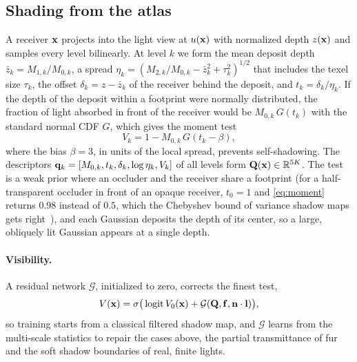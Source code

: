 \subsection{Shading from the atlas}
\label{sec:shading}
A receiver $\mathbf{x}$ projects into the light view at $u(\mathbf{x})$ with normalized depth $z(\mathbf{x})$ and samples every level bilinearly.
At level $k$ we form the mean deposit depth $\bar z_k=M_{1,k}/M_{0,k}$, a spread $\eta_k=(M_{2,k}/M_{0,k}-\bar z_k^2+\tau_k^2)^{1/2}$ that includes the texel size $\tau_k$, the offset $\delta_k=z-\bar z_k$ of the receiver behind the deposit, and $t_k=\delta_k/\eta_k$.
If the depth of the deposit within a footprint were normally distributed, the fraction of light absorbed in front of the receiver would be $M_{0,k}\,G(t_k)$ with the standard normal CDF $G$, which gives the moment test
\begin{equation}
  V_k=1-M_{0,k}\,G(t_k-\beta),
  \label{eq:moment}
\end{equation}
where the bias $\beta=3$, in units of the local spread, prevents self-shadowing.
The descriptors $\mathbf{q}_k=[M_{0,k},t_k,\delta_k,\log\eta_k,V_k]$ of all levels form $\mathbf{Q}(\mathbf{x})\in\mathbb R^{5K}$.
The test is a weak prior where an occluder and the receiver share a footprint (for a half-transparent occluder in front of an opaque receiver, $t_0=1$ and \cref{eq:moment} returns $0.98$ instead of $0.5$, which the Chebyshev bound of variance shadow maps gets right~\cite{donnelly2006variance}), and each Gaussian deposits the depth of its center, so a large, obliquely lit Gaussian appears at a single depth.

\paragraph{Visibility.}
A residual network $\mathcal G$, initialized to zero, corrects the finest test,
\begin{equation}
  V(\mathbf{x})=\sigma\big(\operatorname{logit} V_0(\mathbf{x})+\mathcal G(\mathbf{Q},\mathbf{f},\mathbf{n}\cdot\mathbf{l})\big),
  \label{eq:visibility}
\end{equation}
so training starts from a classical filtered shadow map, and $\mathcal G$ learns from the multi-scale statistics to repair the cases above, the partial transmittance of fur and the soft shadow boundaries of real, finite lights.

